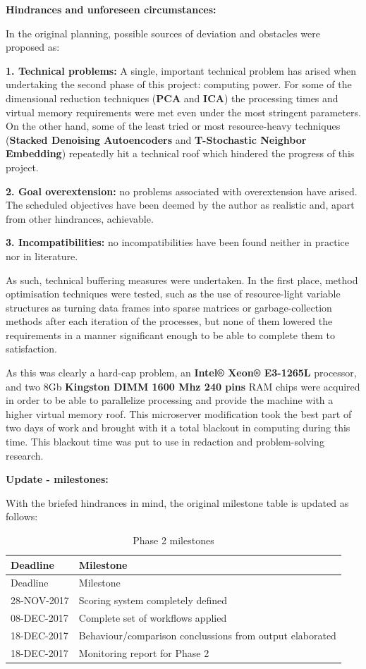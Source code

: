 \documentclass[]{article}
\begin{document}
\textbf{Hindrances and unforeseen circumstances:}

In the original planning, possible sources of deviation and obstacles
were proposed as:

\textbf{1. Technical problems:} A single, important technical problem
has arised when undertaking the second phase of this project: computing
power. For some of the dimensional reduction techniques (\textbf{PCA}
and \textbf{ICA}) the processing times and virtual memory requirements
were met even under the most stringent parameters. On the other hand,
some of the least tried or most resource-heavy techniques
(\textbf{Stacked Denoising Autoencoders} and \textbf{T-Stochastic
Neighbor Embedding}) repeatedly hit a technical roof which hindered the
progress of this project.

\textbf{2. Goal overextension:} no problems associated with
overextension have arised. The scheduled objectives have been deemed by
the author as realistic and, apart from other hindrances, achievable.

\textbf{3. Incompatibilities:} no incompatibilities have been found
neither in practice nor in literature.

As such, technical buffering measures were undertaken. In the first
place, method optimisation techniques were tested, such as the use of
resource-light variable structures as turning data frames into sparse
matrices or garbage-collection methods after each iteration of the
processes, but none of them lowered the requirements in a manner
significant enough to be able to complete them to satisfaction.

As this was clearly a hard-cap problem, an \textbf{Intel® Xeon®
E3-1265L} processor, and two 8Gb \textbf{Kingston DIMM 1600 Mhz 240
pins} RAM chips were acquired in order to be able to parallelize
processing and provide the machine with a higher virtual memory roof.
This microserver modification took the best part of two days of work and
brought with it a total blackout in computing during this time. This
blackout time was put to use in redaction and problem-solving research.

\textbf{Update - milestones:}

With the briefed hindrances in mind, the original milestone table is
updated as follows:

\begin{longtable}[c]{@{}ll@{}}
\caption{Phase 2 milestones}\tabularnewline
\toprule
Deadline & Milestone\tabularnewline
\midrule
\endfirsthead
\toprule
Deadline & Milestone\tabularnewline
\midrule
\endhead
28-NOV-2017 & Scoring system completely defined\tabularnewline
08-DEC-2017 & Complete set of workflows applied\tabularnewline
18-DEC-2017 & Behaviour/comparison conclussions from output
elaborated\tabularnewline
18-DEC-2017 & Monitoring report for Phase 2\tabularnewline
\bottomrule
\end{longtable}
\end{document}

